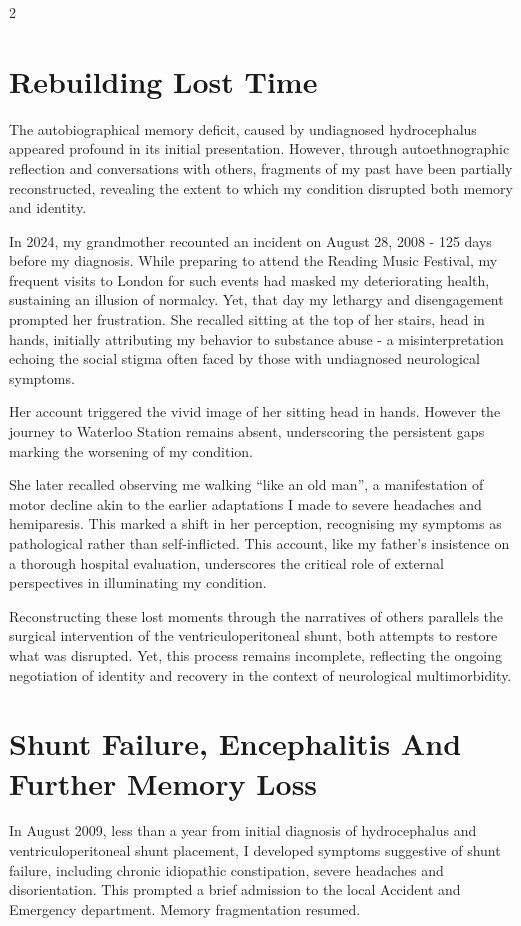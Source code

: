 \documentclass{article}
\begin{document}
\begin{multicols}{2}
\section*{Rebuilding Lost Time}
The autobiographical memory deficit, caused by undiagnosed hydrocephalus appeared profound in its initial presentation. However, through autoethnographic reflection and conversations with others, fragments of my past have been partially reconstructed, revealing the extent to which my condition disrupted both memory and identity. 

In 2024, my grandmother recounted an incident on August 28, 2008 - 125 days before my diagnosis. While preparing to attend the Reading Music Festival, my frequent visits to London for such events had masked my deteriorating health, sustaining an illusion of normalcy. Yet, that day my lethargy and disengagement prompted her frustration. She recalled sitting at the top of her stairs, head in hands, initially attributing my behavior to substance abuse - a misinterpretation echoing the social stigma often faced by those with undiagnosed neurological symptoms. 

Her account triggered the vivid image of her sitting head in hands. However the journey to Waterloo Station remains absent, underscoring the persistent gaps marking the worsening of my condition. 

She later recalled observing me walking “like an old man”, a manifestation of motor decline akin to the earlier adaptations I made to severe headaches and hemiparesis. This marked a shift in her perception, recognising my symptoms as pathological rather than self-inflicted. This account, like my father’s insistence on a thorough hospital evaluation, underscores the critical role of external perspectives in illuminating my condition. 

Reconstructing these lost moments through the narratives of others parallels the surgical intervention of the ventriculoperitoneal shunt, both attempts to restore what was disrupted. Yet, this process remains incomplete, reflecting the ongoing negotiation of identity and recovery in the context of neurological multimorbidity.

\section*{Shunt Failure, Encephalitis And Further Memory Loss}
In August 2009, less than a year from initial diagnosis of hydrocephalus and ventriculoperitoneal shunt placement, I developed symptoms suggestive of shunt failure, including chronic idiopathic constipation, severe headaches and disorientation. This prompted a brief admission to the local Accident and Emergency department. Memory fragmentation resumed.


\end{multicols}
\end{document}
